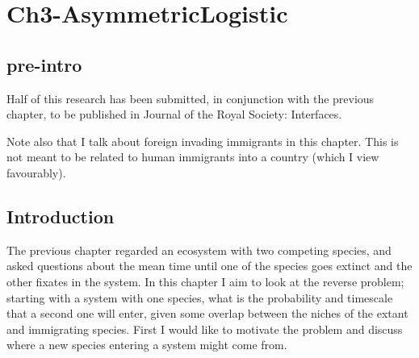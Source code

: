 \chapter{Ch3-AsymmetricLogistic}




\section{pre-intro}%
Half of this research has been submitted, in conjunction with the previous chapter, to be published in Journal of the Royal Society: Interfaces. 

Note also that I talk about foreign invading immigrants in this chapter. This is not meant to be related to human immigrants into a country (which I view favourably). 


\section{Introduction}%
The previous chapter regarded an ecosystem with two competing species, and asked questions about the mean time until one of the species goes extinct and the other fixates in the system. 
In this chapter I aim to look at the reverse problem; starting with a system with one species, what is the probability and timescale that a second one will enter, given some overlap between the niches of the extant and immigrating species. 
First I would like to motivate the problem and discuss where a new species entering a system might come from. 

